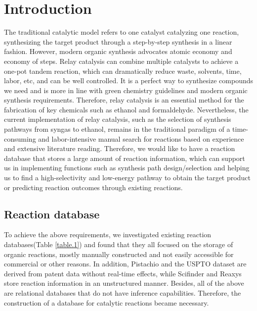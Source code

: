 \documentclass[%
 aip,
 jmp,%
 amsmath,amssymb,
 reprint,%
]{revtex4-2}
\begin{document}
\section{Introduction}

The traditional catalytic model refers to one catalyst catalyzing one reaction, 
synthesizing the target product through a step-by-step synthesis in a linear fashion.
However, modern organic synthesis advocates atomic economy and economy of steps.
Relay catalysis can combine multiple catalysts to achieve a one-pot tandem reaction, 
which can dramatically reduce waste, solvents, time, labor, etc, and can be well 
controlled\cite{xiang2013asymmetric, wang2020recent}. 
It is a perfect way to synthesize compounds we need and is more in line with green 
chemistry guidelines and modern organic synthesis requirements\cite{anastas2010green}. Therefore, 
relay catalysis is an essential method for the fabrication of key chemicals
such as ethanol and formaldehyde. Nevertheless, the current implementation of 
relay catalysis, such as the selection of synthesis pathways from syngas to ethanol\cite{kang2020single}, 
remains in the traditional paradigm of a time-consuming and labor-intensive manual 
search for reactions based on experience and extensive literature reading. Therefore, 
we would like to have a reaction database that stores a large amount of reaction information, 
which can support us in implementing functions such as synthesis path design/selection 
and helping us to find a high-selectivity and low-energy pathway to obtain the target product or
predicting reaction outcomes through existing reactions.


\subsection{Reaction database}
To achieve the above requirements, we investigated existing reaction databases(Table \ref{table.1}) and found that they 
all focused on the storage of organic reactions, mostly manually constructed and not easily
accessible for commercial or other reasons. In addition, Pistachio \cite{pistachio} and the USPTO \cite{lowe2012extraction} dataset are derived from patent data without real-time effects,
while Scifinder \cite{gabrielson2018scifinder} and Reaxys \cite{Reaxys} store reaction information in an unstructured manner. Besides, all of the 
above are relational databases that do not have inference capabilities. Therefore, the construction of a database for catalytic reactions became necessary.
\end{document}
